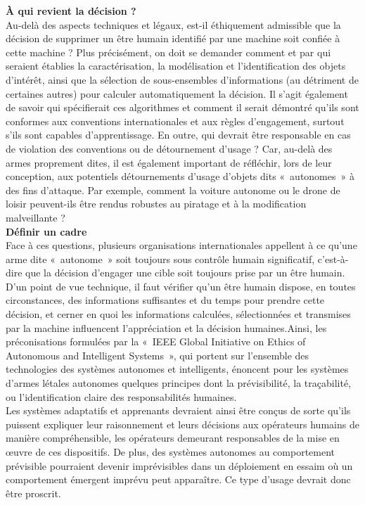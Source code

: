 \documentclass[8pt]{article}
\begin{document}
\textbf{À qui revient la décision ?}\\

Au-delà des aspects techniques et légaux, est-il éthiquement admissible que la décision de supprimer un être humain identifié par une machine soit confiée à cette machine ? Plus précisément, on doit se demander comment et par qui seraient établies la caractérisation, la modélisation et l’identification des objets d’intérêt, ainsi que la sélection de sous-ensembles d’informations (au détriment de certaines autres) pour calculer automatiquement la décision. Il s’agit également de savoir qui spécifierait ces algorithmes et comment il serait démontré qu’ils sont conformes aux conventions internationales et aux règles d’engagement, surtout s’ils sont capables d’apprentissage. En outre, qui devrait être responsable en cas de violation des conventions ou de détournement d’usage ? Car, au-delà des armes proprement dites, il est également important de réfléchir, lors de leur conception, aux potentiels détournements d’usage d’objets dits «~autonomes~» à des fins d’attaque. Par exemple, comment la voiture autonome ou le drone de loisir peuvent-ils être rendus robustes au piratage et à la modification malveillante ?\\

\textbf{Définir un cadre}\\

Face à ces questions, plusieurs organisations internationales appellent à ce qu’une arme dite «~autonome~» soit toujours sous contrôle humain significatif, c’est-à-dire que la décision d’engager une cible soit toujours prise par un être humain. D’un point de vue technique, il faut vérifier qu’un être humain dispose, en toutes circonstances, des informations suffisantes et du temps pour prendre cette décision, et cerner en quoi les informations calculées, sélectionnées et transmises par la machine influencent l’appréciation et la décision humaines.Ainsi, les préconisations formulées par la «~IEEE Global Initiative on Ethics of Autonomous and Intelligent Systems~», qui portent sur l’ensemble des technologies des systèmes autonomes et intelligents, énoncent pour les systèmes d’armes létales autonomes quelques principes dont la prévisibilité, la traçabilité, ou l’identification claire des responsabilités humaines. \\

Les systèmes adaptatifs et apprenants devraient ainsi être conçus de sorte qu’ils puissent expliquer leur raisonnement et leurs décisions aux opérateurs humains de manière compréhensible, les opérateurs demeurant responsables de la mise en œuvre de ces dispositifs. De plus, des systèmes autonomes au comportement prévisible pourraient devenir imprévisibles dans un déploiement en essaim où un comportement émergent imprévu peut apparaître. Ce type d’usage devrait donc être proscrit.\\
\end{document}
